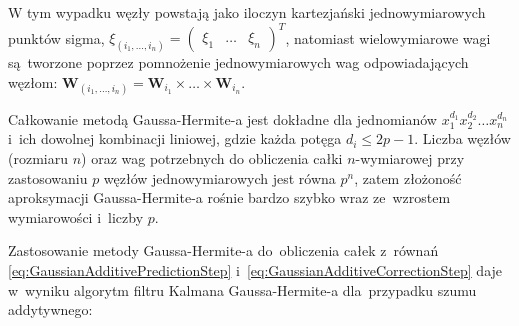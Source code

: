 W tym wypadku węzły powstają jako iloczyn kartezjański jednowymiarowych punktów sigma, $\xi_{(i_1, \dots, i_n)}=\begin{pmatrix}
\xi_1 & \dots & \xi_n
\end{pmatrix}^T$, natomiast wielowymiarowe wagi są~tworzone poprzez pomnożenie jednowymiarowych wag odpowiadających węzłom: $\boldsymbol{W}_{(i_1, \dots, i_n)} = \boldsymbol{W}_{i_1} \times \dots \times \boldsymbol{W}_{i_n}$.
\par
Całkowanie metodą Gaussa-Hermite-a jest dokładne dla jednomianów $x_{1}^{d_{1}} x_{2}^{d_{2}} \dots x_{n}^{d_{n}}$ i~ich dowolnej kombinacji liniowej, gdzie każda potęga $d_i \leq 2p-1$. Liczba węzłów (rozmiaru $n$) oraz wag potrzebnych do obliczenia całki $n$-wymiarowej przy zastosowaniu $p$ węzłów jednowymiarowych jest równa $p^n$, zatem złożoność aproksymacji Gaussa-Hermite-a rośnie bardzo szybko wraz ze~wzrostem wymiarowości i~liczby $p$. \cite[103]{Sarka}
\par
Zastosowanie metody Gaussa-Hermite-a do~obliczenia całek z~równań \ref{eq:GaussianAdditivePredictionStep} i~\ref{eq:GaussianAdditiveCorrectionStep} daje w~wyniku algorytm filtru Kalmana Gaussa-Hermite-a dla~przypadku szumu addytywnego: \cite{Arasaratnam}

